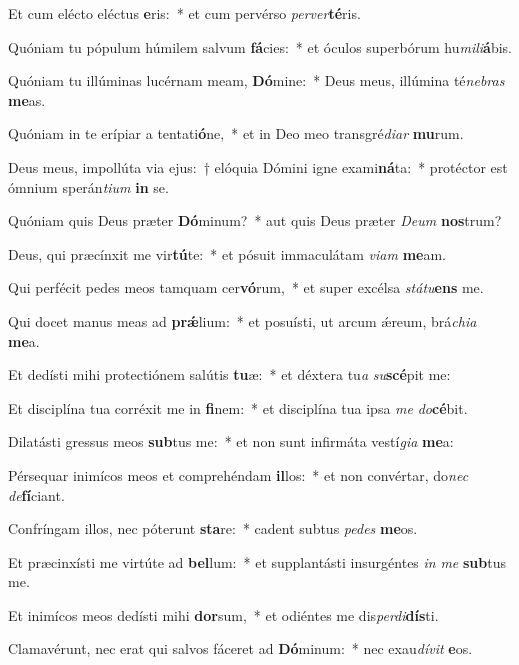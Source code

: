 \item Et cum elécto eléctus \textbf{e}ris:~* et cum pervérso \textit{per}\textit{ver}\textbf{té}ris.
\item Quóniam tu pópulum húmilem salvum \textbf{fá}cies:~* et óculos superbórum hu\textit{mi}\textit{li}\textbf{á}bis.
\item Quóniam tu illúminas lucérnam meam, \textbf{Dó}mine:~* Deus meus, illúmina té\textit{ne}\textit{bras} \textbf{me}as.
\item Quóniam in te erípiar a tentati\textbf{ó}ne,~* et in Deo meo transgré\textit{di}\textit{ar} \textbf{mu}rum.
\item Deus meus, impollúta via ejus:~† elóquia Dómini igne exami\textbf{ná}ta:~* protéctor est ómnium sperán\textit{ti}\textit{um} \textbf{in} se.
\item Quóniam quis Deus præter \textbf{Dó}minum?~* aut quis Deus præter \textit{De}\textit{um} \textbf{nos}trum?
\item Deus, qui præcínxit me vir\textbf{tú}te:~* et pósuit immaculátam \textit{vi}\textit{am} \textbf{me}am.
\item Qui perfécit pedes meos tamquam cer\textbf{vó}rum,~* et super excélsa \textit{stá}\textit{tu}\textbf{ens} me.
\item Qui docet manus meas ad \textbf{prǽ}lium:~* et posuísti, ut arcum ǽreum, brá\textit{chi}\textit{a} \textbf{me}a.
\item Et dedísti mihi protectiónem salútis \textbf{tu}æ:~* et déxtera tu\textit{a} \textit{su}\textbf{scé}pit me:
\item Et disciplína tua corréxit me in \textbf{fi}nem:~* et disciplína tua ipsa \textit{me} \textit{do}\textbf{cé}bit.
\item Dilatásti gressus meos \textbf{sub}tus me:~* et non sunt infirmáta vestí\textit{gi}\textit{a} \textbf{me}a:
\item Pérsequar inimícos meos et comprehéndam \textbf{il}los:~* et non convértar, do\textit{nec} \textit{de}\textbf{fí}ciant.
\item Confríngam illos, nec póterunt \textbf{sta}re:~* cadent subtus \textit{pe}\textit{des} \textbf{me}os.
\item Et præcinxísti me virtúte ad \textbf{bel}lum:~* et supplantásti insurgéntes \textit{in} \textit{me} \textbf{sub}tus me.
\item Et inimícos meos dedísti mihi \textbf{dor}sum,~* et odiéntes me dis\textit{per}\textit{di}\textbf{dís}ti.
\item Clamavérunt, nec erat qui salvos fáceret ad \textbf{Dó}minum:~* nec exau\textit{dí}\textit{vit} \textbf{e}os.
